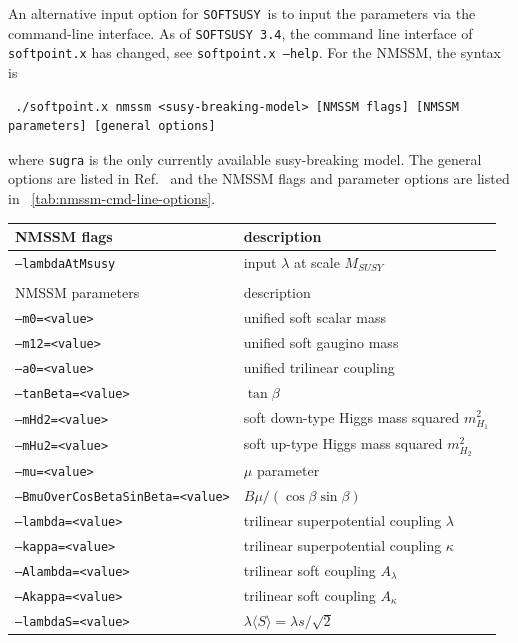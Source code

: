 \documentclass[final,3p,times]{elsarticle}
\def\SOFTSUSY{{\tt SOFTSUSY}}
\def\code#1{\small{\tt #1}\normalsize}
\begin{document}
An alternative input option for \SOFTSUSY\ is to input the parameters via the command-line interface. As of {\tt SOFTSUSY 3.4}, the command line interface of \code{softpoint.x} has
changed, see \code{softpoint.x --help}.  For the NMSSM, the syntax is
%
\small
\begin{verbatim}
 ./softpoint.x nmssm <susy-breaking-model> [NMSSM flags] [NMSSM parameters] [general options]
\end{verbatim}
\normalsize
%
where \code{sugra} is the only currently available susy-breaking
model.  The general options are listed in Ref.~\cite{Allanach:2001kg}
and the NMSSM flags and
parameter options are listed in
\tablename~\ref{tab:nmssm-cmd-line-options}.
%
\begin{table}[tbh]
  \centering
  \begin{tabular}{ll}
    NMSSM flags & description \\
    \hline
    \code{--lambdaAtMsusy} & input $\lambda$ at scale $M_{SUSY}$ \\
    \hline\\
    NMSSM parameters & description \\
    \hline
    \code{--m0=<value>} & unified soft scalar mass \\
    \code{--m12=<value>} & unified soft gaugino mass \\
    \code{--a0=<value>} & unified trilinear coupling \\
    \code{--tanBeta=<value>} & $\tan\beta$ \\
    \code{--mHd2=<value>} & soft down-type Higgs mass squared $m_{H_1}^2$ \\
    \code{--mHu2=<value>} & soft up-type Higgs mass squared $m_{H_2}^2$ \\
    \code{--mu=<value>} & $\mu$ parameter \\
    \code{--BmuOverCosBetaSinBeta=<value>} & $B\mu/(\cos\beta \sin\beta)$ \\
    \code{--lambda=<value>} & trilinear superpotential coupling $\lambda$ \\
    \code{--kappa=<value>} & trilinear superpotential coupling $\kappa$ \\
    \code{--Alambda=<value>} & trilinear soft coupling $A_\lambda$ \\
    \code{--Akappa=<value>} & trilinear soft coupling $A_\kappa$ \\
    \code{--lambdaS=<value>} & $\lambda \langle S \rangle = \lambda s / \sqrt{2}$ \\

\end{tabular}
\end{table}
\end{document}
